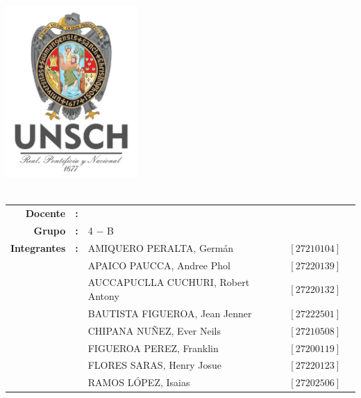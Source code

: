 \thispagestyle{empty}
\phantom{dy}
\begin{center}
	{\Large\scshape\bfseries \dyuniversity}\\
	\vspace{2.5mm}
	{\Large\scshape\bfseries \dyfaculty}\\
    \vspace{2.5mm}
	{\Large\scshape\bfseries \dydept}\\
	\vspace{8mm}
	\includegraphics[width=5cm]{src/images/logo/logounsch_a.png}\\
	
 \vspace{2pt}
	{\Large\bfseries \dycourse}\\
	\vspace{2pt}
	\vspace{5pt}

	\boxabstractd{10cm}{\bfseries\large\centering \dytema}
	\vspace{5pt}
	
 \begin{center}
		\begin{tabular}{rclcl}
			\bf Docente         & \bf: & \dyteacher{}            &   & \\[8pt]
			\bf Grupo      & \bf: &  4 $-$ B    &  & \\[5pt]
			\bf Integrantes      & \bf: &  AMIQUERO PERALTA, Germán     & $[27210104]$ & \\[5pt]
   		\bf       & \bf & APAICO PAUCCA, Andree Phol      & $[27220139]$ & \\[5pt]
   		\bf       & \bf & AUCCAPUCLLA CUCHURI, Robert Antony      & $[27220132]$ & \\[5pt]
   		\bf       & \bf & BAUTISTA FIGUEROA, Jean Jenner      & $[27222501]$ & \\[5pt]
   		\bf       & \bf & CHIPANA NUÑEZ, Ever Neils      & $[27210508]$ & \\[5pt]
		  \bf       & \bf & FIGUEROA PEREZ, Franklin      & $[27200119]$ & \\[5pt]
		  \bf       & \bf & FLORES SARAS, Henry Josue      & $[27220123]$ & \\[5pt]
   		\bf       & \bf & RAMOS LÓPEZ, Isaias    & $[27202506]$ & \\[5pt]
		\end{tabular}
	\end{center}


\end{center}

